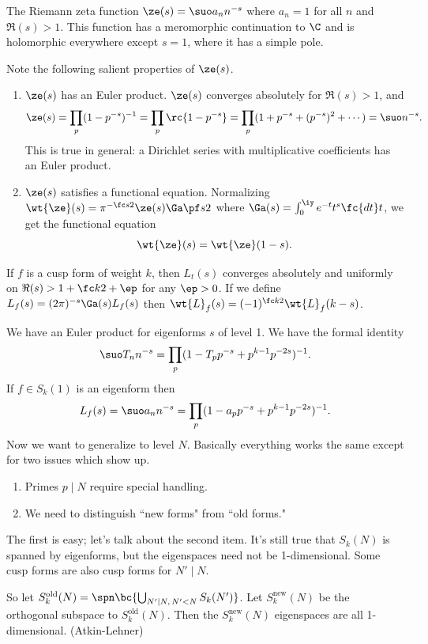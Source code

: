 \begin{ex}
The Riemann zeta function $\ze(s)=\suo a_nn^{-s}$ where $a_n=1$ for all $n$ and $\Re(s)>1$. This function has a meromorphic continuation to $\C$ and is holomorphic everywhere except $s=1$, where it has a simple pole.

Note the following salient properties of $\ze(s)$.
\begin{enumerate}
\item
$\ze(s)$ has an Euler product. $\ze(s)$ converges absolutely for $\Re(s)>1$, and
\[
\ze(s)=\prod_p(1-p^{-s})^{-1}=\prod_p \rc{1-p^{-s}} =\prod_p (1+p^{-s}+(p^{-s})^2+\cdots )=\suo n^{-s}.
\]
This is true in general: a Dirichlet series with multiplicative coefficients has an Euler product.
\item
$\ze(s)$ satisfies a functional equation. Normalizing $\wt{\ze}(s)=\pi^{-\fc s2}\ze(s)\Ga\pf s2$ 
where $\Ga(s)=\int_0^{\iy} e^{-t}t^s\fc{dt}t$, 
we get the functional equation
\[
\wt{\ze}(s)=\wt{\ze}(1-s).
\]
\end{enumerate}
\end{ex}
If $f$ is a cusp form of weight $k$, then $L_t(s)$ converges absolutely and uniformly on $\Re(s)>1+\fc k2+\ep$ for any $\ep>0$. If we define $L_f(s)=(2\pi)^{-s}\Ga(s)L_f(s)$ then $\wt{L}_f(s)=(-1)^{\fc k2}\wt{L}_f(k-s)$.

We have an Euler product for eigenforms $s$ of level 1. We have the formal identity
\[
\suo T_nn^{-s}=\prod_p (1-T_pp^{-s}+p^{k-1}p^{-2s})^{-1}.
\]
If $f\in S_k(1)$ is an eigenform then
\[
L_f(s)=\suo a_nn^{-s} =\prod_p (1-a_pp^{-s}+p^{k-1}p^{-2s})^{-1}.
\]
Now we want to generalize to level $N$. Basically everything works the same except for two issues which show up.
\begin{enumerate}
\item
Primes $p\mid N$ require special handling.
\item
We need to distinguish ``new forms" from ``old forms."
\end{enumerate}
The first is easy; let's talk about the second item. It's still true that $S_k(N)$ is spanned by eigenforms, but the eigenspaces need not be 1-dimensional. Some cusp forms are also cusp forms for $N'\mid N$. %

So let $S_k^{\text{old}}(N)=\spn\bc{\bigcup_{N'\mid N, \,N'<N} S_k(N')}$. Let $S_k^{\text{new}}(N)$ be the orthogonal subspace to $S_k^{\text{old}}(N)$. Then the $S_k^{\text{new}}(N)$ eigenspaces are all 1-dimensional. (Atkin-Lehner)

